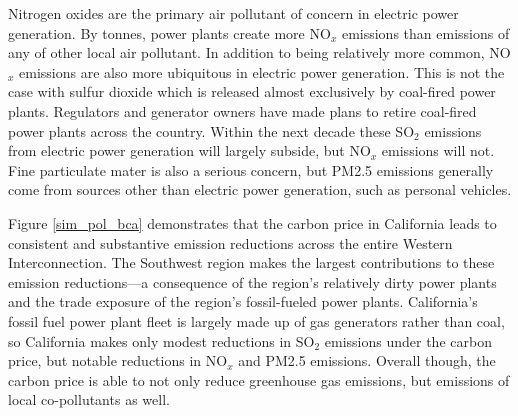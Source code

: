 Nitrogen oxides are the primary air pollutant of concern in electric power generation. By tonnes, power plants create more NO$_x$ emissions than emissions of any of other local air pollutant. In addition to being relatively more common, NO$_x$ emissions are also more ubiquitous in electric power generation. This is not the case with sulfur dioxide which is released almost exclusively by coal-fired power plants. Regulators and generator owners have made plans to retire coal-fired power plants across the country. Within the next decade these SO$_2$ emissions from electric power generation will largely subside, but NO$_x$ emissions will not. Fine particulate mater is also a serious concern, but PM2.5 emissions generally come from sources other than electric power generation, such as personal vehicles. 

Figure \ref{sim_pol_bca} demonstrates that the carbon price in California leads to consistent and substantive emission reductions across the entire Western Interconnection. The Southwest region makes the largest contributions to these emission reductions---a consequence of the region's relatively dirty power plants and the trade exposure of the region's fossil-fueled power plants. California's fossil fuel power plant fleet is largely made up of gas generators rather than coal, so California makes only modest reductions in SO$_2$ emissions under the carbon price, but notable reductions in NO$_x$ and PM2.5 emissions. Overall though, the carbon price is able to not only reduce greenhouse gas emissions, but emissions of local co-pollutants as well. 








